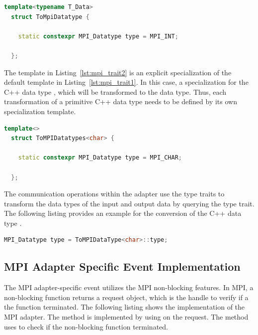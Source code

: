 \begin{lstlisting}[language=C++, label=lst:mpi_trait1, caption={\ }]
  template<typename T_Data> 
  struct ToMpiDatatype { 

    static constexpr MPI_Datatype type = MPI_INT; 

  };
\end{lstlisting}

\noindent The template in Listing~\ref{lst:mpi_trait2} is an explicit
specialization of the default template in
Listing~\ref{lst:mpi_trait1}. In this case, a specialization for the
C++ data type , which will be transformed to the
 data type.  Thus, each transformation of a primitive
C++ data type needs to be defined by its own specialization template.

\begin{lstlisting}[language=C++, label=lst:mpi_trait2, caption={\ }]
  template<>
  struct ToMPIDatatypes<char> { 

    static constexpr MPI_Datatype type = MPI_CHAR; 

  };
\end{lstlisting}

\noindent The communication operations within the adapter use the
type traits to transform the data types of the input and output data
by querying the type trait. The following listing provides an example
for the conversion of the C++ data type .

\begin{lstlisting}[language=C++, label=lst:mpi_trait3]
  MPI_Datatype type = ToMPIDataType<char>::type;
\end{lstlisting}

\subsection{MPI Adapter Specific Event Implementation}
The MPI adapter-specific event utilizes the MPI non-blocking
features. In MPI, a non-blocking function returns a request object,
which is the handle to verify if a the function
terminated. The following listing shows the 
implementation of the MPI adapter.  The  method is
implemented by using  on the request. The 
method uses  to check if the non-blocking function
terminated.

